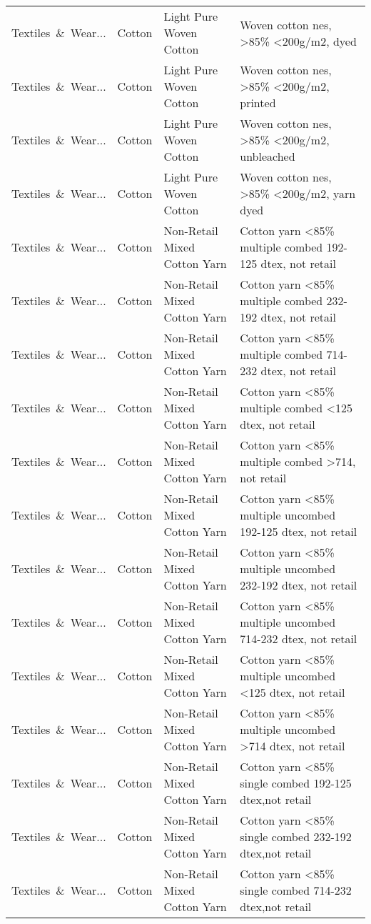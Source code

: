 \begin{appendices}
\begin{xltabular}{\textwidth}{|p{0.10\textwidth}|p{0.25\textwidth}|p{0.24\textwidth}|p{0.31\textwidth}|}
Textiles\ \&\ Wear... & Cotton & Light Pure Woven Cotton & Woven cotton nes, >85\% <200g/m2, dyed \\
Textiles\ \&\ Wear... & Cotton & Light Pure Woven Cotton & Woven cotton nes, >85\% <200g/m2, printed \\
Textiles\ \&\ Wear... & Cotton & Light Pure Woven Cotton & Woven cotton nes, >85\% <200g/m2, unbleached \\
Textiles\ \&\ Wear... & Cotton & Light Pure Woven Cotton & Woven cotton nes, >85\% <200g/m2, yarn dyed \\
Textiles\ \&\ Wear... & Cotton & Non-Retail Mixed Cotton Yarn & Cotton yarn <85\% multiple combed 192-125 dtex, not retail \\
Textiles\ \&\ Wear... & Cotton & Non-Retail Mixed Cotton Yarn & Cotton yarn <85\% multiple combed 232-192 dtex, not retail \\
Textiles\ \&\ Wear... & Cotton & Non-Retail Mixed Cotton Yarn & Cotton yarn <85\% multiple combed 714-232 dtex, not retail \\
Textiles\ \&\ Wear... & Cotton & Non-Retail Mixed Cotton Yarn & Cotton yarn <85\% multiple combed <125 dtex, not retail \\
Textiles\ \&\ Wear... & Cotton & Non-Retail Mixed Cotton Yarn & Cotton yarn <85\% multiple combed >714, not retail \\
Textiles\ \&\ Wear... & Cotton & Non-Retail Mixed Cotton Yarn & Cotton yarn <85\% multiple uncombed 192-125 dtex, not retail \\
Textiles\ \&\ Wear... & Cotton & Non-Retail Mixed Cotton Yarn & Cotton yarn <85\% multiple uncombed 232-192 dtex, not retail \\
Textiles\ \&\ Wear... & Cotton & Non-Retail Mixed Cotton Yarn & Cotton yarn <85\% multiple uncombed 714-232 dtex, not retail \\
Textiles\ \&\ Wear... & Cotton & Non-Retail Mixed Cotton Yarn & Cotton yarn <85\% multiple uncombed <125 dtex, not retail \\
Textiles\ \&\ Wear... & Cotton & Non-Retail Mixed Cotton Yarn & Cotton yarn <85\% multiple uncombed >714 dtex, not retail \\
Textiles\ \&\ Wear... & Cotton & Non-Retail Mixed Cotton Yarn & Cotton yarn <85\% single combed 192-125 dtex,not retail \\
Textiles\ \&\ Wear... & Cotton & Non-Retail Mixed Cotton Yarn & Cotton yarn <85\% single combed 232-192 dtex,not retail \\
Textiles\ \&\ Wear... & Cotton & Non-Retail Mixed Cotton Yarn & Cotton yarn <85\% single combed 714-232 dtex,not retail \\

\end{xltabular}
\end{appendices}
